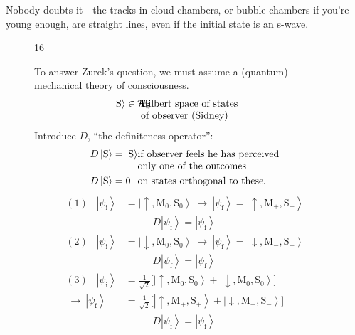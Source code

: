\documentclass[twocolumn,prb]{revtex4}
\newcommand{\ket}[1]{\left|#1\right\rangle}
\renewcommand{\i}{\text{i}}
\newcommand{\f}{\text{f}}
\newcommand{\M}{\text{M}}
\renewcommand{\S}{\text{S}}
\newcommand{\up}{\uparrow}
\newcommand{\dw}{\downarrow}
\begin{document}
Nobody doubts it---the tracks in cloud chambers, or bubble chambers if you're young enough, are straight lines, even if the initial state is an s-wave.
\begin{figure}[htb] 
\begin{mdframed}
  \vspace{5pt}\hfill 16\\[-5pt] 
  \begin{raggedright}
    To answer Zurek's question, we must assume a (quantum) mechanical theory of consciousness.
    \begin{align}\nonumber
        &\hspace{-20pt}
          \ket{\S}\in \mathcal{H}_{\S}
          &&\hspace{-20pt}\text{Hilbert space of 
             states}\\[-3pt]\nonumber
        & &&\hspace{-20pt}\text{of observer (Sidney)}
    \end{align}
  Introduce $D$, ``the definiteness operator'':
  \begin{align}\nonumber
    &\hspace{0pt}
      D\ket{\S}=\ket{\S}
    &&\hspace{-10pt}\text{if observer feels he has 
       perceived}\\[-3pt]\nonumber
    & &&\hspace{-10pt}\text{only one of the
         outcomes}\\[0pt]\nonumber
    &\hspace{0pt}
      D\ket{\S}=0
    &&\hspace{-10pt}\text{on states orthogonal to these.}     
  \end{align}
  \begin{align}\nonumber
    (1)\hspace{10pt} \ket{\psi_\i}&=\ket{\up,\M_0,\S_0}\ \to \ 
             \ket{\psi_\f}=\ket{\up,\M_+,\S_+}\\[3pt]\nonumber
    &\hspace{33pt} D\ket{\psi_\f}=\ket{\psi_\f}\\[6pt]\nonumber
    (2)\hspace{10pt} \ket{\psi_\i}&=\ket{\dw,\M_0,\S_0}\ \to \ 
             \ket{\psi_\f}=\ket{\dw,\M_-,\S_-}\\[3pt]\nonumber
    &\hspace{33pt} D\ket{\psi_\f}=\ket{\psi_\f}\\[6pt]\nonumber
    (3)\hspace{10pt} \ket{\psi_\i}&=\frac{1}{\sqrt{2}}
    \bigl[\ket{\up,\M_0,\S_0}
                     +\ket{\dw,\M_0,\S_0}\bigr]
    \\[1pt]\nonumber
    \ \to\ \ket{\psi_\f}&=\frac{1}{\sqrt{2}}
    \bigl[\ket{\up,\M_+,\S_+}+\ket{\dw,\M_-,\S_-}\bigr]
    \\[3pt]\nonumber
    &\hspace{33pt} D\ket{\psi_\f}=\ket{\psi_\f}
  \end{align}
 \end{raggedright}
\vspace{-.75\baselineskip}
\end{mdframed}
\end{figure}
\end{document}
